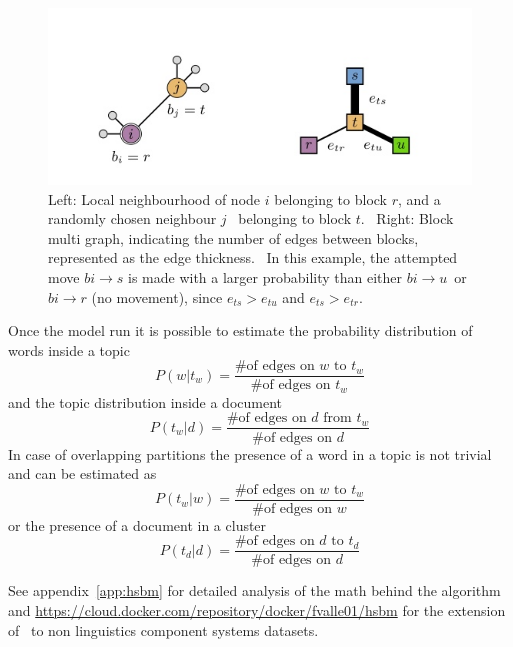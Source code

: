 \begin{figure}[htb!]
  \centering
  \includegraphics[width=0.9\linewidth]{pictures/topic/peixioto_move.jpg}
  \caption{Left: Local neighbourhood of node $i$ belonging to block $r$, and a randomly chosen neighbour $j$ \
  belonging to block $t$. \
  Right: Block multi graph, indicating the number of edges between blocks, represented as the edge thickness. \
  In this example, the attempted move $bi \to s$ is made with a larger probability than either $bi \to u$\
   or $bi \to r$ (no movement), since $e_{ts}>e_{tu}$ and $e_{ts}>e_{tr}$.}
  \label{fig:topic_pixioto_move}
\end{figure}

Once the model run it is possible to estimate the probability distribution of words inside a topic
\[P(w|t_w)=\frac{\text{\# of edges on $w$ to $t_w$}}{\text{\# of edges on $t_w$}}\]
and the topic distribution inside a document
\[P(t_w|d)=\frac{\text{\# of edges on $d$ from $t_w$}}{\text{\# of edges on $d$}}\]
In case of overlapping partitions the presence of a word in a topic is not trivial and can be estimated as 
\[P(t_w|w)=\frac{\text{\# of edges on $w$ to $t_w$}}{\text{\# of edges on $w$}}\]
or the presence of a document in a cluster
\[P(t_d|d)=\frac{\text{\# of edges on $d$ to $t_d$}}{\text{\# of edges on $d$}}\]

See appendix~\ref{app:hsbm} for detailed analysis of the math behind the algorithm and \url{https://cloud.docker.com/repository/docker/fvalle01/hsbm} for the extension of~\cite{gerlach2018network} to non linguistics component systems datasets.